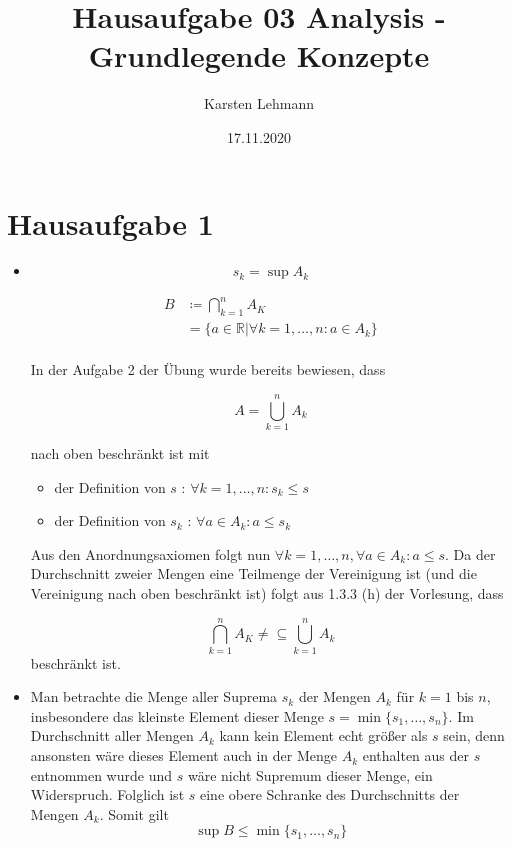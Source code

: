 \documentclass{article}
\author{Karsten Lehmann}
\date{17.11.2020}
\title{Hausaufgabe 03 Analysis - Grundlegende Konzepte}
\begin{document}
\maketitle
\newpage

\section*{Hausaufgabe 1}
\begin{itemize}
\item
  \[
    s_k = \sup A_k
  \]
  
  \begin{align*}
    B &\coloneqq \bigcap_{k = 1}^n A_K \\
      &= \{ a \in \mathbb{R} | \forall k = 1, \ldots, n \colon  a \in A_k \} \\
  \end{align*}
  
  In der Aufgabe 2 der Übung wurde bereits bewiesen, dass
  
  \[
    A = \bigcup_{k = 1}^n A_k
  \]
  
  nach oben beschränkt ist mit
  \begin{itemize}
  \item der Definition von $s$ : $\forall k = 1, \ldots, n \colon s_k \leq s$
  \item der Definition von $s_k$ : $\forall a \in A_k \colon a \leq s_k$
  \end{itemize}

  Aus den Anordnungsaxiomen folgt nun $\forall k = 1, \ldots, n, \forall a \in A_k \colon a \leq s$. Da der Durchschnitt zweier Mengen eine
  Teilmenge der Vereinigung ist (und die Vereinigung nach oben beschränkt ist) folgt aus 1.3.3 (h) der Vorlesung, dass
  
  \[
    \bigcap_{k = 1}^n A_K \ne \subseteq \bigcup_{k = 1}^n A_k
  \]
  beschränkt ist. \\
\item
  Man betrachte die Menge aller Suprema $s_k$ der Mengen $A_k$ für $k = 1$ bis $n$, insbesondere das kleinste Element dieser Menge $s = \min \{ s_1, \ldots, s_n \}$.
  Im Durchschnitt aller Mengen $A_k$ kann kein Element echt größer als $s$ sein, denn ansonsten wäre dieses Element
  auch in der Menge $A_k$ enthalten aus der $s$ entnommen wurde und $s$ wäre nicht Supremum dieser Menge, ein Widerspruch.
  Folglich ist $s$ eine obere Schranke des Durchschnitts der Mengen $A_k$. Somit gilt
  \[
    \sup B \leq \min \{ s_1, \ldots, s_n \}
  \]


\end{itemize}
\end{document}
